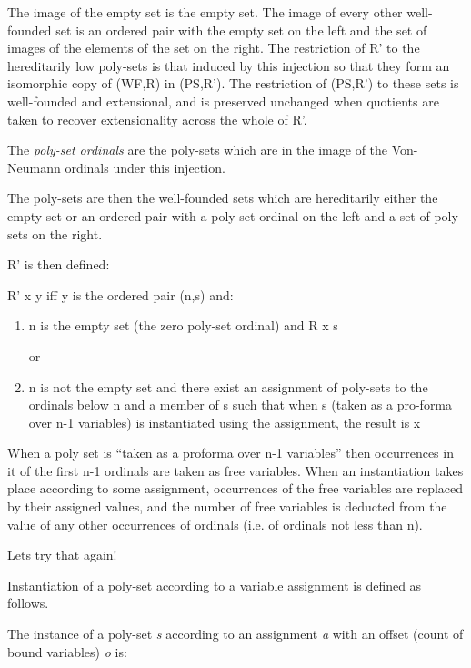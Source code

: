 \documentclass[numreferences]{rbjk}
\begin{document}
\begin{article}
The image of the empty set is the empty set.
The image of every other well-founded set is an ordered pair with the empty set on the left and the set of images of the elements of the set on the right.
The restriction of \textsf{R'} to the hereditarily low poly-sets is that induced by this injection so that they form an isomorphic copy of \textsf{(WF,R)} in \textsf{(PS,R')}.
The restriction of \textsf{(PS,R')} to these sets is well-founded and extensional, and is preserved unchanged when quotients are taken to recover extensionality across the whole of \textsf{R'}.

The \emph{poly-set ordinals} are the poly-sets which are in the image of the Von-Neumann ordinals under this injection.

The poly-sets are then the well-founded sets which are hereditarily either the empty set or an ordered pair with a poly-set ordinal on the left and a set of poly-sets on the right.

\textsf{R'} is then defined:

\textsf{R' x y} iff y is the ordered pair \textsf{(n,s)} and:

\begin{enumerate}
\item n is the empty set (the zero poly-set ordinal) and \textsf{R x s} 

or
\item n is not the empty set and there exist an assignment of poly-sets to the ordinals below n and a member of s such that when s (taken as a pro-forma over n-1 variables) is instantiated using the assignment, the result is x 
\end{enumerate}

When a poly set is ``taken as a proforma over n-1 variables'' then occurrences in it of the first n-1 ordinals are taken as free variables.
When an instantiation takes place according to some assignment, occurrences of the free variables are replaced by their assigned values, and the number of free variables is deducted from the value of any other occurrences of ordinals (i.e. of ordinals not less than n).

Lets try that again!

Instantiation of a poly-set according to a variable assignment is defined as follows.

The instance of a poly-set \emph{s} according to an assignment \emph{a} with an offset (count of bound variables) \emph{o} is:


\end{article}
\end{document}
